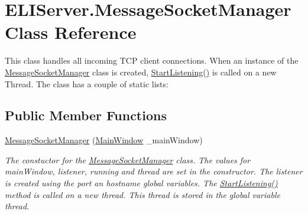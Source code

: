\hypertarget{class_e_l_i_server_1_1_message_socket_manager}{}\section{E\+L\+I\+Server.\+Message\+Socket\+Manager Class Reference}
\label{class_e_l_i_server_1_1_message_socket_manager}


This class handles all incoming T\+CP client connections. When an instance of the \hyperlink{class_e_l_i_server_1_1_message_socket_manager}{Message\+Socket\+Manager} class is created, \hyperlink{class_e_l_i_server_1_1_message_socket_manager_ab5d2f61a349046960ae63303ff1c2130}{Start\+Listening()} is called on a new Thread. The class has a couple of static lists\+:  


\subsection*{Public Member Functions}
\begin{DoxyCompactItemize}
\item 
\hyperlink{class_e_l_i_server_1_1_message_socket_manager_a28b6d0e215aa417970fc82b9239bebbb}{Message\+Socket\+Manager} (\hyperlink{class_e_l_i_server_1_1_main_window}{Main\+Window} \+\_\+main\+Window)
\begin{DoxyCompactList}\small\item\em The constuctor for the \hyperlink{class_e_l_i_server_1_1_message_socket_manager}{Message\+Socket\+Manager} class. The values for main\+Window, listener, running and thread are set in the constructor. The listener is created using the port an hostname global variables. The \hyperlink{class_e_l_i_server_1_1_message_socket_manager_ab5d2f61a349046960ae63303ff1c2130}{Start\+Listening()} method is called on a new thread. This thread is stored in the global variable thread. \end{DoxyCompactList}\end{DoxyCompactItemize}
